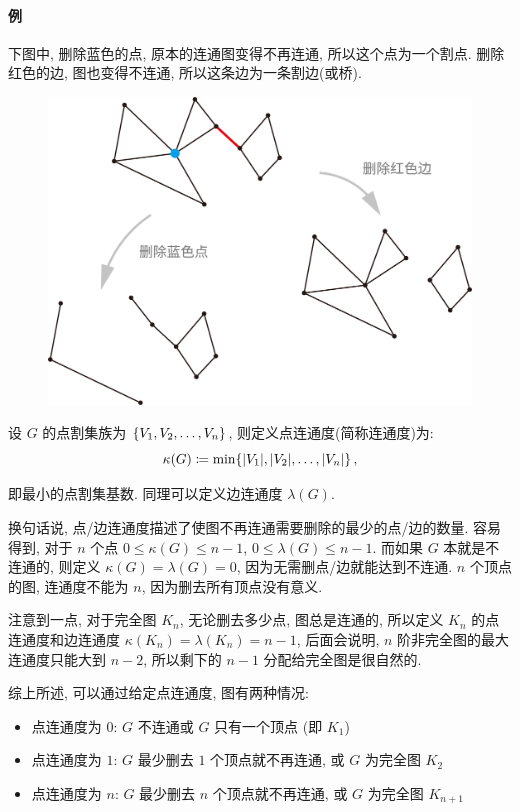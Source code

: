 \documentclass[UTF8]{ctexart}
\theoremstyle{mystyle}
\theoremstyle{myremark}
\theoremstyle{plain}
\DeclarePairedDelimiter\set{\{}{\}}
\begin{document}
\paragraph{例}
下图中, 删除蓝色的点, 原本的连通图变得不再连通, 所以这个点为一个割点. 删除红色的边, 图也变得不连通, 所以这条边为一条割边(或桥).
\begin{figure}[H]
    \centering
    \includegraphics[width = 0.7\linewidth]{./images/bridge.png}
\end{figure}


\begin{definition}
    设 $ G $ 的点割集族为 $ \set{V_1, V_2, \dots, V_n} $, 则定义点连通度(简称连通度)为:
    \[ \kappa(G) \coloneqq \min\set{|V_1|, |V_2|, \dots, |V_n|} \,,\]

    即最小的点割集基数. 同理可以定义边连通度 $ \lambda(G) $.
\end{definition}

换句话说, 点/边连通度描述了使图不再连通需要删除的最少的点/边的数量. 容易得到, 对于 $ n $ 个点 $ 0 \leqslant \kappa(G) \leqslant n - 1 $, $ 0 \leqslant \lambda(G) \leqslant n - 1 $. 而如果 $ G $ 本就是不连通的, 则定义 $ \kappa(G) = \lambda(G) = 0 $, 因为无需删点/边就能达到不连通. $ n $ 个顶点的图, 连通度不能为 $ n $, 因为删去所有顶点没有意义.

注意到一点, 对于完全图 $ K_n $, 无论删去多少点, 图总是连通的, 所以定义 $ K_n $ 的点连通度和边连通度 $ \kappa(K_n) = \lambda(K_n) = n - 1 $, 后面会说明, $ n $ 阶非完全图的最大连通度只能大到 $ n - 2 $, 所以剩下的 $ n - 1 $ 分配给完全图是很自然的.

综上所述, 可以通过给定点连通度, 图有两种情况:
\begin{itemize}
    \item 点连通度为 $ 0 $: $ G $ 不连通或 $ G $ 只有一个顶点 (即 $ K_1 $)
    \item 点连通度为 $ 1 $: $ G $ 最少删去 $ 1 $ 个顶点就不再连通, 或 $ G $ 为完全图 $ K_2 $
    \item 点连通度为 $ n $: $ G $ 最少删去 $ n $ 个顶点就不再连通, 或 $ G $ 为完全图 $ K_{n + 1} $
\end{itemize}
\end{document}
